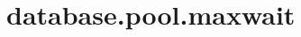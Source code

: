 \section{database.pool.maxwait}
\label{configuration:DatabasePoolMaxwait}
\AvailableInJavaOnly{\TODO}